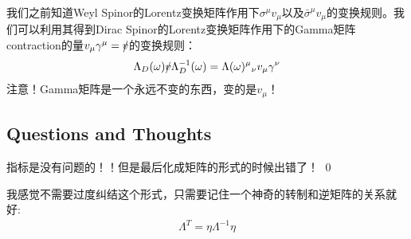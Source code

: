\bigskip
{}

我们之前知道Weyl Spinor的Lorentz变换矩阵作用下$ \sigma^\mu v_\mu $以及$
\bar{\sigma}^\mu v_\mu $的变换规则。我们可以利用其得到Dirac
Spinor的Lorentz变换矩阵作用下的Gamma矩阵contraction的量$ v_\mu \gamma^\mu = \slashed{v} $的变换规则：
\begin{align}
  \Lambda_{D}(\omega)\slashed{v}\Lambda_{D}^{-1}(\omega)=\Lambda(\omega)^\mu{}_\nu
  v_\mu \gamma^\nu
\end{align}
注意！Gamma矩阵是一个永远不变的东西，变的是$ v_\mu $！

\subsection{Questions and Thoughts}

指标是没有问题的！！但是最后化成矩阵的形式的时候出错了！
\qed


我感觉不需要过度纠结这个形式，只需要记住一个神奇的转制和逆矩阵的关系就好:
\begin{align}
  \Lambda^T=\eta\Lambda^{-1}\eta
\end{align}
